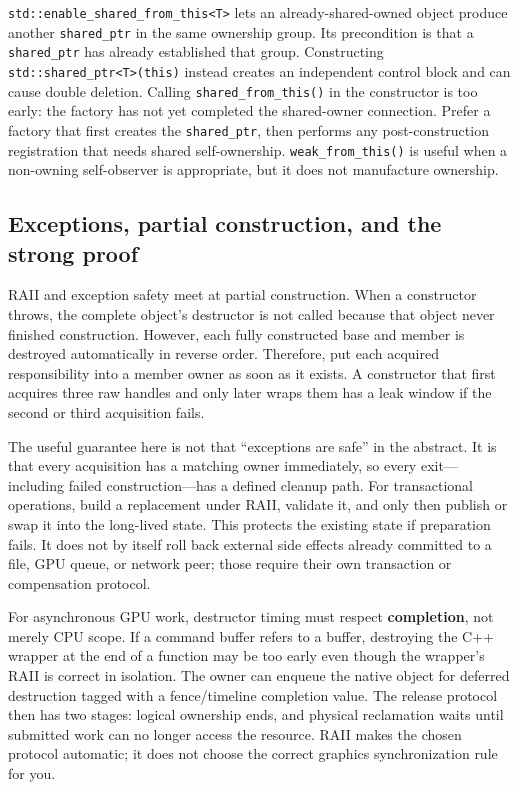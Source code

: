\texttt{std::enable\_shared\_from\_this\textless{}T\textgreater{}} lets an already-shared-owned object produce another \texttt{shared\_ptr} in the same ownership group. Its precondition is that a \texttt{shared\_ptr} has already established that group. Constructing \texttt{std::shared\_ptr\textless{}T\textgreater{}(this)} instead creates an independent control block and can cause double deletion. Calling \texttt{shared\_from\_this()} in the constructor is too early: the factory has not yet completed the shared-owner connection. Prefer a factory that first creates the \texttt{shared\_ptr}, then performs any post-construction registration that needs shared self-ownership. \texttt{weak\_from\_this()} is useful when a non-owning self-observer is appropriate, but it does not manufacture ownership.

\subsection{Exceptions, partial construction, and the strong proof}\label{05-engine-i-ch004-exceptions-partial-construction-and-the-strong-proof}

\hypertarget{05-engine-i-ch004-exceptions-partial-construction-and-the-strong-proof}{}

RAII and exception safety meet at partial construction. When a constructor throws, the complete object's destructor is not called because that object never finished construction. However, each fully constructed base and member is destroyed automatically in reverse order. Therefore, put each acquired responsibility into a member owner as soon as it exists. A constructor that first acquires three raw handles and only later wraps them has a leak window if the second or third acquisition fails.

The useful guarantee here is not that ``exceptions are safe'' in the abstract. It is that every acquisition has a matching owner immediately, so every exit---including failed construction---has a defined cleanup path. For transactional operations, build a replacement under RAII, validate it, and only then publish or swap it into the long-lived state. This protects the existing state if preparation fails. It does not by itself roll back external side effects already committed to a file, GPU queue, or network peer; those require their own transaction or compensation protocol.

For asynchronous GPU work, destructor timing must respect \textbf{completion}, not merely CPU scope. If a command buffer refers to a buffer, destroying the C++ wrapper at the end of a function may be too early even though the wrapper's RAII is correct in isolation. The owner can enqueue the native object for deferred destruction tagged with a fence/timeline completion value. The release protocol then has two stages: logical ownership ends, and physical reclamation waits until submitted work can no longer access the resource. RAII makes the chosen protocol automatic; it does not choose the correct graphics synchronization rule for you.

